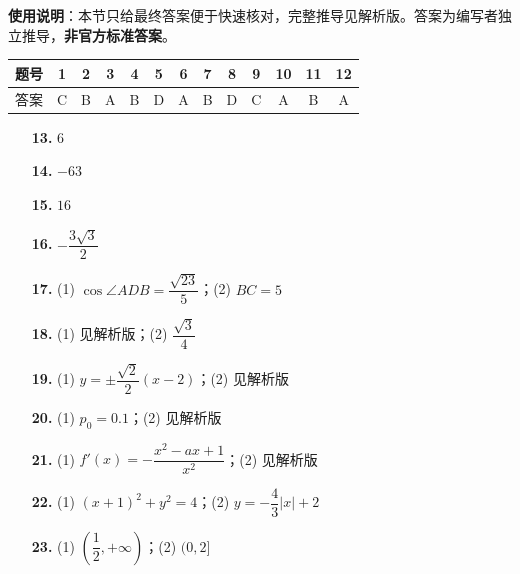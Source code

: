 
\begin{gknotice}
\textbf{使用说明}：本节只给最终答案便于快速核对，完整推导见解析版。答案为编写者独立推导，\textbf{非官方标准答案}。
\end{gknotice}

\begin{center}\begin{tabular}{ccccccccccccc}
\toprule
题号 & 1 & 2 & 3 & 4 & 5 & 6 & 7 & 8 & 9 & 10 & 11 & 12 \\
\midrule
答案 & C & B & A & B & D & A & B & D & C & A & B & A \\
\bottomrule
\end{tabular}\end{center}

\begin{itemize}[leftmargin=2.6em]
  \item[\textbf{13.}] $6$
  \item[\textbf{14.}] $-63$
  \item[\textbf{15.}] $16$
  \item[\textbf{16.}] $-\dfrac{3\sqrt3}2$
\end{itemize}

\begin{itemize}[leftmargin=2.6em]
  \item[\textbf{17.}] (1) $\cos\angle ADB=\dfrac{\sqrt{23}}5$；(2) $BC=5$
  \item[\textbf{18.}] (1) 见解析版；(2) $\dfrac{\sqrt3}4$
  \item[\textbf{19.}] (1) $y=\pm\dfrac{\sqrt2}2(x-2)$；(2) 见解析版
  \item[\textbf{20.}] (1) $p_0=0.1$；(2) 见解析版
  \item[\textbf{21.}] (1) $f'(x)=-\dfrac{x^{2}-ax+1}{x^{2}}$；(2) 见解析版
\end{itemize}

\begin{itemize}[leftmargin=2.6em]
  \item[\textbf{22.}] (1) $(x+1)^{2}+y^{2}=4$；(2) $y=-\dfrac43|x|+2$
  \item[\textbf{23.}] (1) $\left(\dfrac12,+\infty\right)$；(2) $(0,2]$
\end{itemize}
